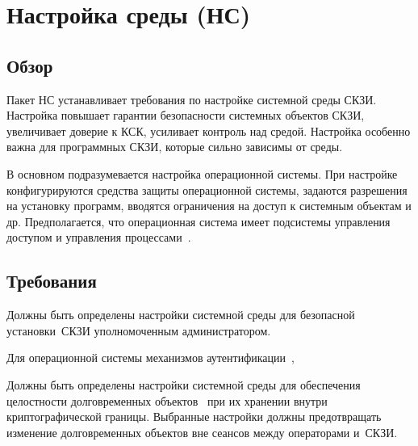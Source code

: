 \section{Настройка среды (НС)}\label{ES}

\subsection{Обзор}\label{ES.Defs}

Пакет НС устанавливает требования по настройке системной среды СКЗИ.
Настройка повышает гарантии безопасности системных объектов СКЗИ,
увеличивает доверие к КСК, усиливает контроль над средой.
%
Настройка особенно важна для программных СКЗИ, которые сильно зависимы от 
среды.


В основном подразумевается настройка операционной системы.
%
При настройке конфигурируются средства защиты операционной системы, 
задаются разрешения на установку программ, 
вводятся ограничения на доступ к системным объектам и др.
%
Предполагается, что операционная система имеет подсистемы управления 
доступом и управления 
процессами~.

\subsection{Требования}\label{ES.Reqs}

\label{R.ES.Install} %
Должны быть определены настройки системной среды
для безопасной установки~СКЗИ уполномоченным администратором.

\begin{note}
Для  операционной системы  механизмов аутентификации~, 
\end{note}

\label{R.ES.Objects} %
Должны быть определены настройки системной среды
для обеспечения целостности долговременных объектов~ 
при их хранении внутри криптографической границы. 
%
Выбранные настройки должны предотвращать 
изменение долговременных объектов вне сеансов между операторами и~СКЗИ.

